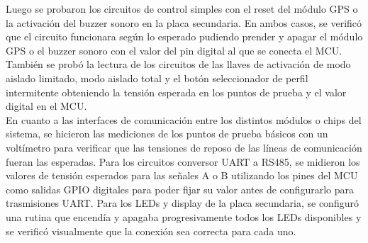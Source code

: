 Luego se probaron los circuitos de control simples con el reset del módulo GPS o la activación del buzzer sonoro en la placa secundaria. En ambos casos, se verificó que el circuito funcionara según lo esperado pudiendo prender y apagar el módulo GPS o el buzzer sonoro con el valor del pin digital al que se conecta el MCU. También se probó la lectura de los circuitos de las llaves de activación de modo aislado limitado, modo aislado total y el botón seleccionador de perfil intermitente obteniendo la tensión esperada en los puntos de prueba y el valor digital en el MCU. \\ 

En cuanto a las interfaces de comunicación entre los distintos módulos o chips del sistema, se hicieron las mediciones de los puntos de prueba básicos con un voltímetro para verificar que las tensiones de reposo de las líneas de comunicación fueran las esperadas. Para los circuitos conversor UART a RS485, se midieron los valores de tensión esperados para las señales A o B utilizando los pines del MCU como salidas GPIO digitales para poder fijar su valor antes de configurarlo para trasmisiones UART. Para los LEDs y display de la placa secundaria, se configuró una rutina que encendía y apagaba progresivamente todos los LEDs disponibles y se verificó visualmente que la conexión sea correcta para cada uno.  







